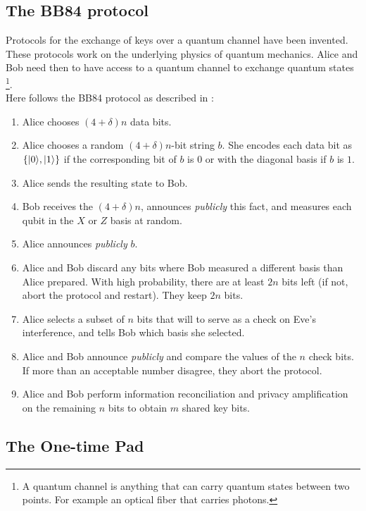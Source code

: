 	\subsection{The BB84 protocol}
	Protocols for the exchange of keys over a quantum channel have been invented.
	These protocols work on the underlying physics of quantum mechanics.
	Alice and Bob need then to have access to a quantum channel to exchange quantum states
	\footnote{A quantum channel is anything that can carry quantum states between two points. For example an optical fiber that carries photons.}.\\
	Here follows the BB84 protocol as described in \cite{NC10} :
		\begin{enumerate}
			\item Alice chooses $(4+\delta )n$ data bits.
			\item Alice chooses a random $(4+\delta )n$-bit string $b$. She encodes each data bit as $\{|0 \rangle,|1 \rangle\}$ if the corresponding bit of $b$ is $0$ or with the diagonal basis if $b$ is $1$.
			\item Alice sends the resulting state to Bob.
			\item Bob receives the $(4+\delta )n$, announces \emph{publicly} this fact, and measures each qubit in the $X$ or $Z$ basis at random.
			\item Alice announces \emph{publicly} $b$.
			\item Alice and Bob discard any bits where Bob measured a different basis than Alice prepared. With high probability, there are at least $2n$ bits left (if not, abort the protocol and restart). They keep $2n$ bits.
			\item Alice selects a subset of $n$ bits that will to serve as a check on Eve's interference, and tells Bob which basis she selected.
			\item Alice and Bob announce \emph{publicly} and compare the values of the $n$ check bits. If more than an acceptable number disagree, they abort the protocol.
			\item Alice and Bob perform information reconciliation and privacy amplification on the remaining $n$ bits to obtain $m$ shared key bits.
		\end{enumerate}

	\subsection{The One-time Pad}
		
